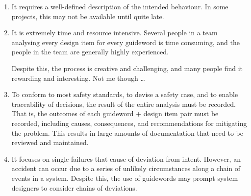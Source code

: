 \begin{enumerate}

 \item It requires a well-defined description of the intended behaviour. In some projects, this may not be available until quite late.

 \item It is extremely time and resource intensive. Several people in a team analysing every design item for every guideword is time consuming, and the people in the team are generally highly experienced.

 Despite this, the process is creative and challenging, and many people find it rewarding and interesting. 
 Not me though \ldots

 \item To conform to most safety standards, to devise a safety case, and to enable traceability of decisions, the result of the entire analysis must be recorded. That is, the outcomes of each guideword + design item pair must be recorded, including causes, consequences, and recommendations for mitigating the problem.
  This results in large amounts of documentation that need to be  reviewed and maintained.

 \item It focuses on single failures that cause of deviation from intent. However, an accident can occur due to a series of unlikely circumstances along a chain of events in a system. 
 Despite this, the use of guidewords may prompt system designers to consider chains of deviations.

\end{enumerate}

